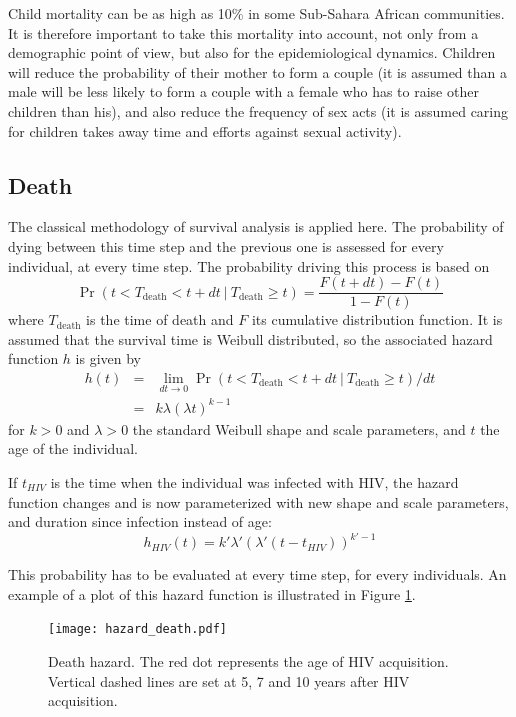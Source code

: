 \documentclass[11pt, onecolumn]{article}
\begin{document}
Child mortality can be as high as 10\% in some Sub-Sahara African communities. It is therefore important to take this mortality into account, not only from a demographic point of view, but also for the epidemiological dynamics. Children will reduce the probability of their mother to form a couple (it is assumed than a male will be less likely to form a couple with a female who has to raise other children than his), and also reduce the  frequency of sex acts (it is assumed caring for children takes away time and efforts against sexual activity). 


\subsection{Death}

The classical methodology of survival analysis is applied here. The probability of dying between this time step and the previous one is assessed for every individual, at every time step. The probability driving this process is based on 
$$\Pr(t<T_{\mathrm{death}}<t+dt \ | \ T_{\mathrm{death}}\geq t) = \frac{F(t+dt)-F(t)}{1-F(t)}$$
where $T_{\mathrm{death}}$ is the time of death and $F$ its cumulative distribution function. It is assumed that the survival time is Weibull distributed, so the associated hazard function $h$  is given by
\begin{eqnarray}
h(t) &=& \lim_{dt\to 0}\Pr(t<T_{\mathrm{death}}<t+dt \ | \ T_{\mathrm{death}}\geq t)/dt \\
 & =& k\lambda(\lambda t)^{k-1}
\end{eqnarray}
for $k>0$ and $\lambda>0$ the standard Weibull shape and scale parameters, and $t$ the age of the individual. 

If $t_{HIV}$ is the time when the individual was infected with HIV, the hazard function changes and is now parameterized with new shape and scale parameters, and duration since infection instead of age:
$$h_{HIV}(t) = k'\lambda'(\lambda' (t-t_{HIV}))^{k'-1}$$

This probability has to be evaluated at every time step, for every individuals. An example of a plot of this hazard function is illustrated in Figure \ref{fig:deathHazard}.

\begin{figure}[!ht]
\centering
    \texttt{[image: hazard\_death.pdf]}
\caption{Death hazard. The red dot represents the age of HIV acquisition. Vertical dashed lines are set at 5, 7 and 10 years after HIV acquisition.}
\label{fig:deathHazard}
\end{figure}
\end{document}
